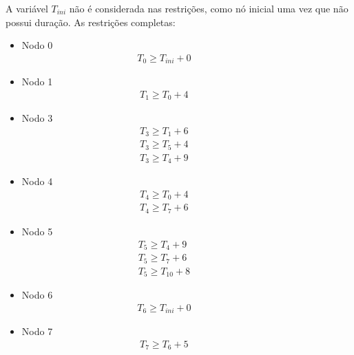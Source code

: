 A variável $T_{ini}$ não é considerada nas restrições, como nó inicial uma vez
que não possui duração.
As restrições completas:

\begin{itemize}


\item Nodo 0
	\begin{align*}
		T_0 \ge T_{ini} + 0 &         &         &         &         &         &
	\end{align*}


\item Nodo 1
	\begin{align*}
T_1 \ge T_0 + 4 &         &         &         &         &         &
	\end{align*}


\item Nodo 3
\begin{align*}
T_3 \ge T_1 + 6 &         &         &         &         &         &\\
T_3 \ge T_5 + 4 &         &         &         &         &         &\\
T_3 \ge T_4 + 9 &         &         &         &         &         &
	\end{align*}



\item Nodo 4
\begin{align*}
T_4 \ge T_0 + 4 &         &         &         &         &         &\\
T_4 \ge T_7 + 6 &         &         &         &         &         &
	\end{align*}


\item Nodo 5
\begin{align*}
        T_5 \ge T_4 + 9  &         &         &         &         &         &\\
        T_5 \ge T_7 + 6  &         &         &         &         &         &\\
        T_5 \ge T_{10} + 8  &         &         &         &         &         &
	\end{align*}


\item Nodo 6
	\begin{align*}
	T_6 \ge T_{ini} + 0 &         &         &         &         &         &
	\end{align*}

\item Nodo 7
\begin{align*}
       T_7 \ge T_6 + 5  &         &         &         &         &         &\\
	\end{align*}



\end{itemize}
